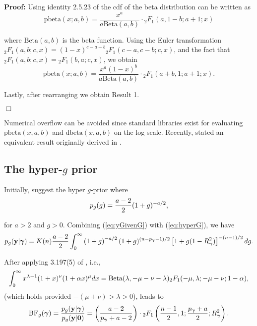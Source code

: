  
\noindent 
{\bf Proof:} Using identity 2.5.23 of \cite{Abramowitz1972} the cdf of the beta distribution
can be written as
$$
\mbox{pbeta}(x;a,b) = \frac{x^a}{a\mbox{Beta}(a,b)} \cdot {}_2F_1(a,1-b;a+1;x) 
$$

\noindent where 
$\mbox{Beta}(a,b)$ is the beta function.
Using the Euler transformation
${}_2 F_1(a,b;c,x) = (1 - x)^{c-a-b} {}_2 F_1(c-a,c-b;c,x)$,
and the fact that ${}_2 F_1(a,b;c,x)={}_2 F_1(b,a;c,x)$,  we obtain
$$
\mbox{pbeta}(x;a,b) = \frac{x^a(1 - x)^{b}}{a\mbox{Beta}(a,b)} \cdot {}_2F_1(a+b,1;a+1;x). 
$$

\noindent Lastly, after rearranging we obtain Result 1.
\vspace{-0.5cm}\begin{flushright}$\Box$\end{flushright}

\noindent Numerical overflow can be avoided
since standard libraries exist for evaluating $\mbox{pbeta}(x,a,b)$ and $\mbox{dbeta}(x,a,b)$
on the log scale. Recently, \cite{Nadarajah2015} stated an equivalent result
originally derived in \cite{PrudnikovEtal1986}. 




\subsection{The hyper-$g$ prior}

\noindent 
Initially, \cite{Liang2008} suggest the hyper $g$-prior where
\begin{equation}\label{eq:hyperG}
	\displaystyle p_{g}(g) = \frac{a - 2}{2}(1 + g)^{-a/2},
\end{equation}

\noindent for $a>2$ and $g>0$. Combining (\ref{eq:yGivenG}) with (\ref{eq:hyperG}), we have
\begin{equation}\label{eq:hyperGmarginalIntegral}
	p_{g}({\bf y}|{\boldsymbol \gamma}) = K(n) \frac{a - 2}{2}  \int_0^\infty 
	\left( 1 + g \right)^{-a/2}
	(1 + g)^{(n-p_{\boldsymbol \gamma}-1)/2} \left[ 1 + g (1 - R_{\boldsymbol \gamma}^2) \right]^{-(n-1)/2}  dg.
\end{equation}

\noindent After applying 
3.197(5) of \cite{Gradshteyn2007}, i.e.,
\begin{equation}\label{eq:31975}
	\displaystyle 
	\int_0^\infty x^{\lambda - 1}(1 + x)^\nu (1 + \alpha x)^\mu dx
	=\mbox{Beta}(\lambda,-\mu-\nu-\lambda){}_2F_1(-\mu,\lambda;-\mu-\nu; 1 - \alpha),
\end{equation}
\noindent (which holds provided $-(\mu  + \nu) > \lambda > 0$),
leads to
\begin{equation}\label{eq:hyperGmarginal}
	\displaystyle \mbox{BF}_{g}({\boldsymbol \gamma}) = \frac{p_{g}({\bf y}|{\boldsymbol \gamma})}{p_{g}({\bf y}|{\bf 0})} =  \left( \frac{a - 2}{p_{\boldsymbol \gamma} + a - 2} \right) \cdot {}_2F_1\left( \frac{n-1}{2}, 1; \frac{p_{\boldsymbol \gamma} + a}{2}; R_{\boldsymbol \gamma}^2 \right).
\end{equation}

